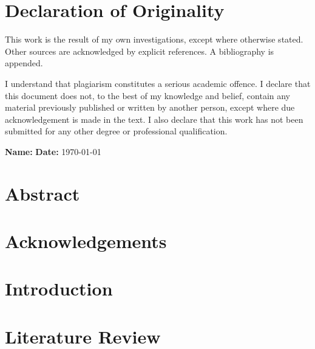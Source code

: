 \documentclass{l5eng}
\begin{document}
\customTitlePage


\chapter*{Declaration of Originality}
This work is the result of my own investigations, except where otherwise stated. Other sources are acknowledged by explicit references. A bibliography is appended.

I understand that plagiarism constitutes a serious academic offence. I declare that this document does not, to the best of my knowledge and belief, contain any material previously published or written by another person, except where due acknowledgement is made in the text. I also declare that this work has not been submitted for any other degree or professional qualification.

\vspace{2cm}
\noindent
\textbf{Name:} %
\textbf{Date:} \today
{}
\clearpage

\chapter*{Abstract}

\clearpage

\chapter*{Acknowledgements}


\clearpage

\tableofcontents
\clearpage


\chapter{Introduction}



\chapter{Literature Review}

\end{document}
